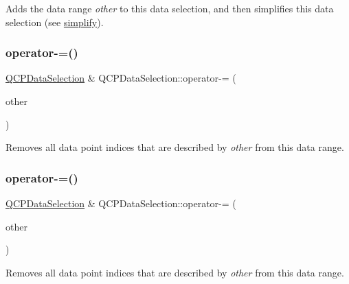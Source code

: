 Adds the data range {\itshape other} to this data selection, and then simplifies this data selection (see \hyperlink{class_q_c_p_data_selection_a4a2fbad1a6e4d1dd26fdfdf88956f2a4}{simplify}). \mbox{\label{class_q_c_p_data_selection_a66f9fab70b026baa64bf8e52fe5de07e}} 
\subsubsection{\texorpdfstring{operator-\/=()}{operator-=()}\hspace{0.1cm}{\footnotesize\ttfamily [1/2]}}
{\footnotesize\ttfamily \hyperlink{class_q_c_p_data_selection}{Q\+C\+P\+Data\+Selection} \& Q\+C\+P\+Data\+Selection\+::operator-\/= (\begin{DoxyParamCaption}\item[{const \hyperlink{class_q_c_p_data_selection}{Q\+C\+P\+Data\+Selection} \&}]{other }\end{DoxyParamCaption})}

Removes all data point indices that are described by {\itshape other} from this data range. \mbox{\label{class_q_c_p_data_selection_a8d18b20d20dde737eefc10967e31cf73}} 
\subsubsection{\texorpdfstring{operator-\/=()}{operator-=()}\hspace{0.1cm}{\footnotesize\ttfamily [2/2]}}
{\footnotesize\ttfamily \hyperlink{class_q_c_p_data_selection}{Q\+C\+P\+Data\+Selection} \& Q\+C\+P\+Data\+Selection\+::operator-\/= (\begin{DoxyParamCaption}\item[{const \hyperlink{class_q_c_p_data_range}{Q\+C\+P\+Data\+Range} \&}]{other }\end{DoxyParamCaption})}

Removes all data point indices that are described by {\itshape other} from this data range. \mbox{\label{class_q_c_p_data_selection_a664fa566569b17148abafd6b1dbbf347}} 
